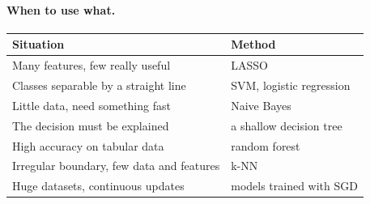 \paragraph{When to use what.}
\begin{center}
    \begin{tabular}{l|l}
        \textbf{Situation} & \textbf{Method} \\ \hline
        Many features, few really useful          & LASSO \\
        Classes separable by a straight line      & SVM, logistic regression \\
        Little data, need something fast          & Naive Bayes \\
        The decision must be explained            & a shallow decision tree \\
        High accuracy on tabular data             & random forest \\
        Irregular boundary, few data and features & k-NN \\
        Huge datasets, continuous updates         & models trained with SGD \\
    \end{tabular}
\end{center}

